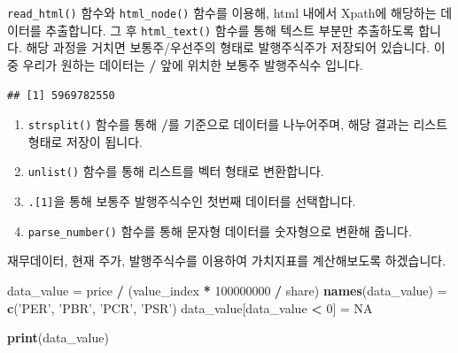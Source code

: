 \documentclass[12pt,]{book}
\newenvironment{Shaded}{\begin{snugshade}}{\end{snugshade}}
\newcommand{\DecValTok}[1]{\textcolor[rgb]{0.00,0.00,0.81}{#1}}
\newcommand{\KeywordTok}[1]{\textcolor[rgb]{0.13,0.29,0.53}{\textbf{#1}}}
\newcommand{\NormalTok}[1]{#1}
\newcommand{\OperatorTok}[1]{\textcolor[rgb]{0.81,0.36,0.00}{\textbf{#1}}}
\newcommand{\OtherTok}[1]{\textcolor[rgb]{0.56,0.35,0.01}{#1}}
\newcommand{\StringTok}[1]{\textcolor[rgb]{0.31,0.60,0.02}{#1}}
\providecommand{\tightlist}{%
  \setlength{\itemsep}{0pt}\setlength{\parskip}{0pt}}
\begin{document}
\texttt{read\_html()} 함수와 \texttt{html\_node()} 함수를 이용해, html 내에서 Xpath에 해당하는 데이터를 추출합니다. 그 후 \texttt{html\_text()} 함수를 통해 텍스트 부분만 추출하도록 합니다. 해당 과정을 거치면 보통주/우선주의 형태로 발행주식주가 저장되어 있습니다. 이 중 우리가 원하는 데이터는 \textbf{/} 앞에 위치한 보통주 발행주식수 입니다.

\begin{Shaded}
\end{Shaded}

\begin{verbatim}
## [1] 5969782550
\end{verbatim}

\begin{enumerate}
\def\labelenumi{\arabic{enumi}.}
\tightlist
\item
  \texttt{strsplit()} 함수를 통해 \textbf{/}를 기준으로 데이터를 나누어주며, 해당 결과는 리스트 형태로 저장이 됩니다.
\item
  \texttt{unlist()} 함수를 통해 리스트를 벡터 형태로 변환합니다.
\item
  \texttt{.{[}1{]}}을 통해 보통주 발행주식수인 첫번째 데이터를 선택합니다.
\item
  \texttt{parse\_number()} 함수를 통해 문자형 데이터를 숫자형으로 변환해 줍니다.
\end{enumerate}

재무데이터, 현재 주가, 발행주식수를 이용하여 가치지표를 계산해보도록 하겠습니다.

\begin{Shaded}
\begin{Highlighting}[]
\NormalTok{data_value =}\StringTok{ }\NormalTok{price }\OperatorTok{/}\StringTok{ }\NormalTok{(value_index }\OperatorTok{*}\StringTok{ }\DecValTok{100000000} \OperatorTok{/}\StringTok{ }\NormalTok{share)}
\KeywordTok{names}\NormalTok{(data_value) =}\StringTok{ }\KeywordTok{c}\NormalTok{(}\StringTok{'PER'}\NormalTok{, }\StringTok{'PBR'}\NormalTok{, }\StringTok{'PCR'}\NormalTok{, }\StringTok{'PSR'}\NormalTok{)}
\NormalTok{data_value[data_value }\OperatorTok{<}\StringTok{ }\DecValTok{0}\NormalTok{] =}\StringTok{ }\OtherTok{NA}

\KeywordTok{print}\NormalTok{(data_value)}
\end{Highlighting}
\end{Shaded}
\end{document}
